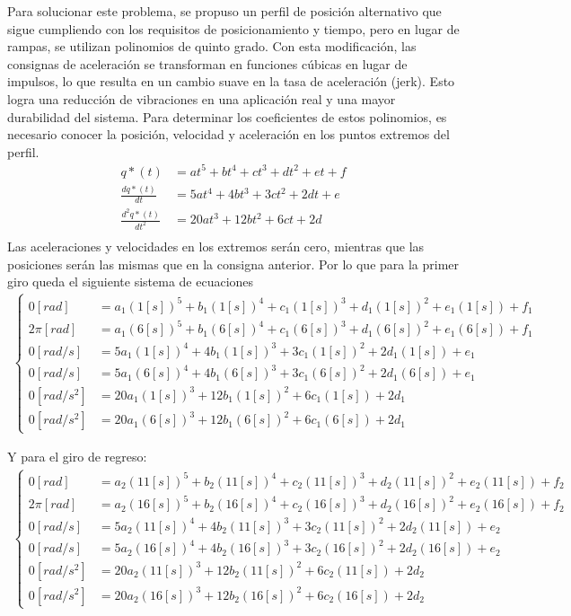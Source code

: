 \documentclass[a4paper, 10pt, onecolumn,journal]{ieeeconf}
\begin{document}
Para solucionar este problema, se propuso un perfil de posición alternativo que sigue cumpliendo con los requisitos de posicionamiento y tiempo, pero en lugar de rampas, se utilizan polinomios de quinto grado. Con esta modificación, las consignas de aceleración se transforman en funciones cúbicas en lugar de impulsos, lo que resulta en un cambio suave en la tasa de aceleración (jerk). Esto logra una reducción de vibraciones en una aplicación real y una mayor durabilidad del sistema. Para determinar los coeficientes de estos polinomios, es necesario conocer la posición, velocidad y aceleración en los puntos extremos del perfil.
\begin{align}
	q*(t) &= at^5 + bt^4 + ct^3 + dt^2 + et + f  \\
	\frac{d q*(t)}{dt} &=  5at^4 + 4bt^3 + 3ct^2 + 2dt + e \\
	\frac{d^2 q*(t)}{dt^2} &=  20at^3 + 12bt^2 + 6ct + 2d\\
\end{align}
Las aceleraciones y velocidades en los extremos serán cero, mientras que las posiciones serán las mismas que en la consigna anterior. Por lo que para la primer giro queda el siguiente sistema de ecuaciones
\begin{align}
	\begin{cases}
		0[rad]  &= a_1(1 [s])^5 + b_1(1 [s])^4 + c_1(1 [s])^3 + d_1(1 [s])^2 + e_1(1 [s]) + f_1 \\
		2\pi [rad] &= a_1(6 [s])^5 + b_1(6 [s])^4 + c_1(6 [s])^3 + d_1(6 [s])^2 + e_1(6 [s]) + f_1  \\
		0[rad/s] &= 5a_1(1 [s])^4 + 4b_1(1 [s])^3 + 3c_1(1 [s])^2 + 2d_1(1 [s]) + e_1 \\
		0[rad/s] &= 5a_1(6 [s])^4 + 4b_1(6 [s])^3 + 3c_1(6 [s])^2 + 2d_1(6 [s]) + e_1 \\
		0[rad/s^2] &= 20a_1(1 [s])^3 + 12b_1(1 [s])^2 + 6c_1(1 [s]) + 2d_1 \\
		0[rad/s^2] &= 20a_1(6 [s])^3 + 12b_1(6 [s])^2 + 6c_1(6 [s]) + 2d_1
	\end{cases}
\end{align}

Y para el giro de regreso:
\begin{align}
	\begin{cases}
		0[rad]  &= a_2(11 [s])^5 + b_2(11 [s])^4 + c_2(11 [s])^3 + d_2(11 [s])^2 + e_2(11 [s]) + f_2 \\
		2\pi [rad] &= a_2(16 [s])^5 + b_2(16 [s])^4 + c_2(16 [s])^3 + d_2(16 [s])^2 + e_2(16 [s]) + f_2  \\
		0[rad/s] &= 5a_2(11 [s])^4 + 4b_2(11 [s])^3 + 3c_2(11 [s])^2 + 2d_2(11 [s]) + e_2 \\
		0[rad/s] &= 5a_2(16 [s])^4 + 4b_2(16 [s])^3 + 3c_2(16 [s])^2 + 2d_2(16 [s]) + e_2 \\
		0[rad/s^2] &= 20a_2(11 [s])^3 + 12b_2(11 [s])^2 + 6c_2(11 [s]) + 2d_2 \\
		0[rad/s^2] &= 20a_2(16 [s])^3 + 12b_2(16 [s])^2 + 6c_2(16 [s]) + 2d_2
	\end{cases}
\end{align}
\end{document}

